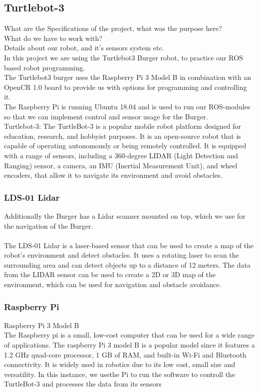 \documentclass{article}
\begin{document}
\subsection*{Turtlebot-3}
What are the Specifications of the project, what was the purpose here?\\
What do we have to work with?\\
Details about our robot, and it's sensors system etc.\\

In this project we are using the Turtlebot3 Burger robot, to practice our ROS based robot programming.\\
The Turtlebot3 burger uses the Raspberry Pi 3 Model B in combination with an OpenCR 1.0 board to 
provide us with options for programming and controlling it. \\
The Raspberry Pi is running Ubuntu 18.04 and is used to run our ROS-modules so that we can 
implement control and sensor usage for the Burger.\\
Turtlebot-3: The TurtleBot-3 is a popular mobile robot platform designed for education, research, and hobbyist purposes.
It is an open-source robot that is capable of operating autonomously or being remotely controlled.
It is equipped with a range of sensors, including a 360-degree LIDAR (Light Detection and Ranging) sensor, 
a camera, an IMU (Inertial Measurement Unit), and wheel encoders, that allow it to navigate its environment and avoid obstacles.
\\
\subsubsection*{LDS-01 Lidar}
Additionally the Burger has a Lidar scanner mounted on top, which we use for the navigation of the Burger.\\
\\
The LDS-01 Lidar is a laser-based sensor that can be used to create a map of the robot's environment
and detect obstacles. It uses a rotating laser to scan the surrounding area and can detect objects up to a
distance of 12 meters. The data from the LIDAR sensor can be used to create a 2D or 3D map of the environment,
which can be used for navigation and obstacle avoidance.\\

\subsubsection*{Raspberry Pi}
Raspberry Pi 3 Model B\\
The Raspberry pi is a small, low-cost computer that can be used for a wide range of applications. The raspberry Pi 3 model B 
is a popular model since it features a 1.2 GHz quad-core processor, 1 GB of RAM, and built-in Wi-Fi and Bluetooth connectivity.
It is widely used in robotics due to its low cost, small size and versatility. In this instance, we usethe Pi to run the software to controll the TurtleBot-3 
and processes the data from its sensors
\end{document}
